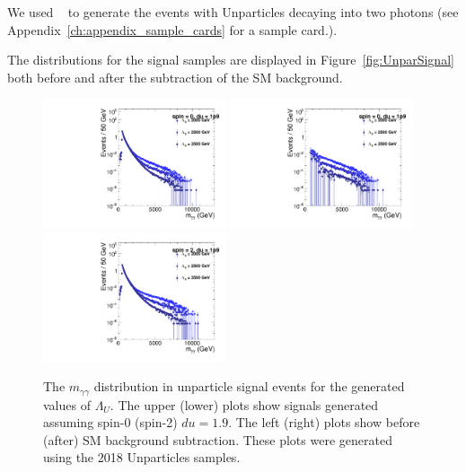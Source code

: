 
We used ~\cite{Sjostrand:2008za} to generate the events with Unparticles decaying into two photons (see Appendix~\ref{ch:appendix_sample_cards} for a sample \PYTHIA card.).

The \mgg distributions for the signal samples are displayed in Figure~\ref{fig:UnparSignal} both before and after the subtraction of the SM background. 


\begin{figure}[htbp!]
\caption{The $m_{\gamma\gamma}$ distribution in unparticle signal events for the generated values of $\Lambda_U$. The upper (lower) plots show signals generated assuming spin-0 (spin-2) $du=1.9$. The left (right) plots show before (after) SM background subtraction. These plots were generated using the 2018 Unparticles samples.}
\begin{center}
\includegraphics[angle=0,width=0.48\textwidth]{fig/UnparToGG_Spin0_du1p9_TuneCP2_13TeV_pythia8_2018.pdf}
\includegraphics[angle=0,width=0.48\textwidth]{fig/UnparToGG_Spin0_du1p9_TuneCP2_13TeV_pythia8_2018_bkg_sub.pdf}
\includegraphics[angle=0,width=0.48\textwidth]{fig/UnparToGG_Spin2_du1p9_TuneCP2_13TeV_pythia8_2018.pdf}

\end{center}
\end{figure}
